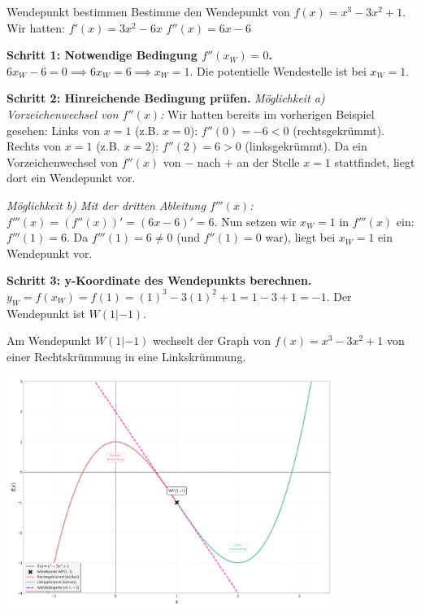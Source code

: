 \begin{beispielumgebung}{Wendepunkt bestimmen}
Bestimme den Wendepunkt von $f(x) = x^3 - 3x^2 + 1$.
Wir hatten:
$f'(x) = 3x^2 - 6x$
$f''(x) = 6x - 6$

\textbf{Schritt 1: Notwendige Bedingung $f''(x_W)=0$.}
$6x_W - 6 = 0 \implies 6x_W = 6 \implies x_W = 1$.
Die potentielle Wendestelle ist bei $x_W=1$.

\textbf{Schritt 2: Hinreichende Bedingung prüfen.}
\textit{Möglichkeit a) Vorzeichenwechsel von $f''(x)$:}
Wir hatten bereits im vorherigen Beispiel gesehen:
Links von $x=1$ (z.B. $x=0$): $f''(0) = -6 < 0$ (rechtsgekrümmt).
Rechts von $x=1$ (z.B. $x=2$): $f''(2) = 6 > 0$ (linksgekrümmt).
Da ein Vorzeichenwechsel von $f''(x)$ von $-$ nach $+$ an der Stelle $x=1$ stattfindet, liegt dort ein Wendepunkt vor.

\textit{Möglichkeit b) Mit der dritten Ableitung $f'''(x)$:}
$f'''(x) = (f''(x))' = (6x-6)' = 6$.
Nun setzen wir $x_W=1$ in $f'''(x)$ ein:
$f'''(1) = 6$.
Da $f'''(1) = 6 \neq 0$ (und $f''(1)=0$ war), liegt bei $x_W=1$ ein Wendepunkt vor.

\textbf{Schritt 3: y-Koordinate des Wendepunkts berechnen.}
$y_W = f(x_W) = f(1) = (1)^3 - 3(1)^2 + 1 = 1 - 3 + 1 = -1$.
Der Wendepunkt ist $W(1|-1)$.

Am Wendepunkt $W(1|-1)$ wechselt der Graph von $f(x)=x^3-3x^2+1$ von einer Rechtskrümmung in eine Linkskrümmung.
\begin{center}
    \includegraphics[width=0.8\textwidth]{grafiken/Differentialrechnung_Wendepunkt.png}
    \label{fig:wendepunkt_bsp}
\end{center}
\end{beispielumgebung}

